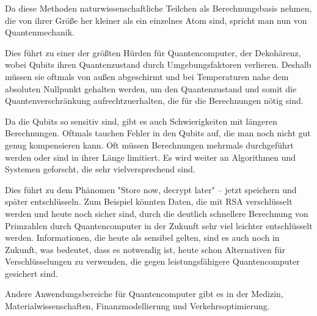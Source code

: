 Da diese Methoden naturwissenschaftliche Teilchen als Berechnungsbasis nehmen, die von ihrer Größe her kleiner als ein einzelnes Atom sind, spricht man nun von Quantenmechanik. 

Dies führt zu einer der größten Hürden für Quantencomputer, der Dekohärenz, wobei Qubits ihren Quantenzustand durch Umgebungsfaktoren verlieren. Deshalb müssen sie oftmals von außen abgeschirmt und bei Temperaturen nahe dem absoluten Nullpunkt gehalten werden, um den Quantenzustand und somit die Quantenverschränkung aufrechtzuerhalten, die für die Berechnungen nötig sind.

Da die Qubits so sensitiv sind, gibt es auch Schwierigkeiten mit längeren Berechnungen. Oftmals tauchen Fehler in den Qubits auf, die man noch nicht gut genug kompensieren kann. Oft müssen Berechnungen mehrmals durchgeführt werden oder sind in ihrer Länge limitiert.\cite{brubaker_quantum_2024} Es wird weiter an Algorithmen und Systemen geforscht, die sehr vielversprechend sind.

Dies führt zu dem Phänomen "Store now, decrypt later" – jetzt speichern und später entschlüsseln. Zum Beispiel könnten Daten, die mit RSA verschlüsselt werden und heute noch sicher sind, durch die deutlich schnellere Berechnung von Primzahlen durch Quantencomputer in der Zukunft sehr viel leichter entschlüsselt werden. 
Informationen, die heute als sensibel gelten, sind es auch noch in Zukunft, was bedeutet, dass es notwendig ist, heute schon Alternativen für Verschlüsselungen zu verwenden, die gegen leistungsfähigere Quantencomputer gesichert sind.\cite{veritasium_how_2023}

Andere Anwendungsbereiche für Quantencomputer gibt es in der Medizin, 
Materialwissenschaften, Finanzmodellierung 
und Verkehrsoptimierung. \cite{Applications_10_nodate}